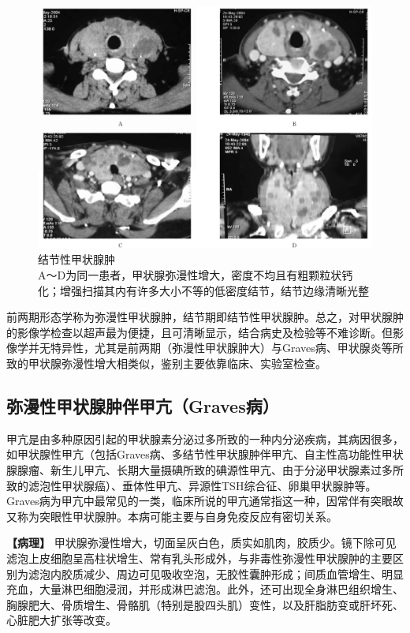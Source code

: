 \begin{figure}[!htbp]
 \centering
 \includegraphics[width=.7\textwidth,height=\textheight,keepaspectratio]{./images/Image00177.jpg}
 \captionsetup{justification=centering}
 \caption{结节性甲状腺肿\\{\small A～D为同一患者，甲状腺弥漫性增大，密度不均且有粗颗粒状钙化；增强扫描其内有许多大小不等的低密度结节，结节边缘清晰光整}}
 \label{fig8-9}
  \end{figure} 

前两期形态学称为弥漫性甲状腺肿，结节期即结节性甲状腺肿。总之，对甲状腺肿的影像学检查以超声最为便捷，且可清晰显示，结合病史及检验等不难诊断。但影像学并无特异性，尤其是前两期（弥漫性甲状腺肿大）与Graves病、甲状腺炎等所致的甲状腺弥漫性增大相类似，鉴别主要依靠临床、实验室检查。

\subsection{弥漫性甲状腺肿伴甲亢（Graves病）}

甲亢是由多种原因引起的甲状腺素分泌过多所致的一种内分泌疾病，其病因很多，如甲状腺性甲亢（包括Graves病、多结节性甲状腺肿伴甲亢、自主性高功能性甲状腺腺瘤、新生儿甲亢、长期大量摄碘所致的碘源性甲亢、由于分泌甲状腺素过多所致的滤泡性甲状腺癌）、垂体性甲亢、异源性TSH综合征、卵巢甲状腺肿等。Graves病为甲亢中最常见的一类，临床所说的甲亢通常指这一种，因常伴有突眼故又称为突眼性甲状腺肿。本病可能主要与自身免疫反应有密切关系。

\textbf{【病理】}
甲状腺弥漫性增大，切面呈灰白色，质实如肌肉，胶质少。镜下除可见滤泡上皮细胞呈高柱状增生、常有乳头形成外，与非毒性弥漫性甲状腺肿的主要区别为滤泡内胶质减少、周边可见吸收空泡，无胶性囊肿形成；间质血管增生、明显充血，大量淋巴细胞浸润，并形成淋巴滤泡。此外，还可出现全身淋巴组织增生、胸腺肥大、骨质增生、骨骼肌（特别是股四头肌）变性，以及肝脂肪变或肝坏死、心脏肥大扩张等改变。

